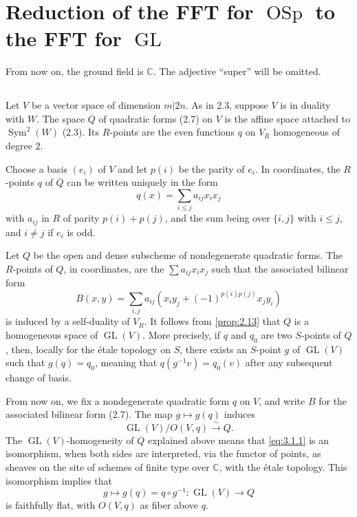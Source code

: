 \documentclass[11pt,a4paper]{article}
\theoremstyle{plain}
\theoremstyle{definition}
\DeclareMathOperator{\GL}{GL}
\DeclareMathOperator{\OSp}{OSp}
\DeclareMathOperator{\Sym}{Sym}
\newcommand{\simto}{\xrightarrow{\sim}}
\newcommand{\C}{\mathbb{C}}
\begin{document}
\section{Reduction of the FFT for $\OSp$ to the FFT for $\GL$}

From now on, the ground field is $\C$. The adjective ``super'' will be omitted.

\subsection{}
\label{sec:3.1}
Let $V$ be a vector space of dimension $m|2n$. As in 2.3, suppose $V$ is in duality with $W$. The space $\overline{Q}$ of quadratic forms (2.7) on $V$ is the affine space attached to $\Sym^2(W)$ (2.3). Its $R$-points are the even functions $q$ on $V_R$ homogeneous of degree $2$.

Choose a basis $(e_i)$ of $V$ and let $p(i)$ be the parity of $e_i$. In coordinates, the $R$-points $q$ of $\overline{Q}$ can be written uniquely in the form
\[
q(x) = \sum_{i \leq j} a_{ij} x_i x_j
\]
with $a_{ij}$ in $R$ of parity $p(i) + p(j)$, and the sum being over $\{i,j\}$ with $i \leq j$, and $i \neq j$ if $e_i$ is odd.

Let $Q$ be the open and dense subscheme of nondegenerate quadratic forms. The $R$-points of $Q$, in coordinates, are the $\sum a_{ij} x_i x_j$ such that the associated bilinear form
\[
B(x,y) = \sum_{i,j} a_{ij} (x_i y_j + (-1)^{p(i)p(j)} x_j y_i)
\]
is induced by a self-duality of $V_R$. It follows from \ref{prop:2.13} that $Q$ is a homogeneous space of $\GL(V)$. More precisely, if $q$ and $q_0$ are two $S$-points of $Q$, then, locally for the \'etale topology on $S$, there exists an $S$-point $g$ of $\GL(V)$ such that $g(q) = q_0$, meaning that $q(g^{-1}v) = q_0(v)$ after any subsequent change of basis.

From now on, we fix a nondegenerate quadratic form $q$ on $V$, and write $B$ for the associated bilinear form (2.7). The map $g \mapsto g(q)$ induces
\begin{equation}\label{eq:3.1.1}
\GL(V)/O(V,q) \simto Q.
\end{equation}
The $\GL(V)$-homogeneity of $Q$ explained above means that \eqref{eq:3.1.1} is an isomorphism, when both sides are interpreted, via the functor of points, as sheaves on the site of schemes of finite type over $\C$, with the \'etale topology. This isomorphism implies that
\[
g \mapsto g(q) = q \circ g^{-1} : \GL(V) \to Q
\]
is faithfully flat, with $O(V,q)$ as fiber above $q$.
\end{document}
